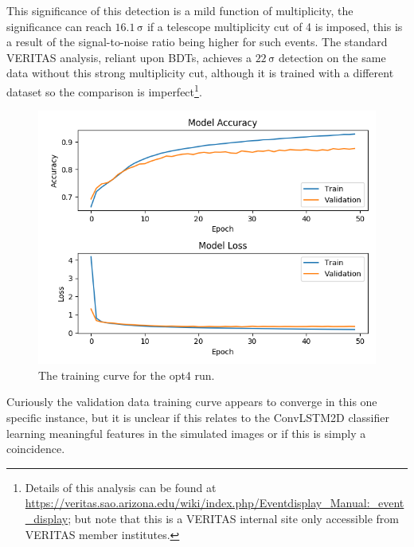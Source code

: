 \begin{table}[h]
    \centering
    \caption{Anasum output for the opt4 run, without applying a strenuous multiplicity cut.}
    \label{table:opt4}
\end{table}

This significance of this detection is a mild function of multiplicity, the significance can reach $\mathrm{16.1\,\sigma}$ if a telescope multiplicity cut of 4 is imposed, this is a result of the signal-to-noise ratio being higher for such events. The standard VERITAS analysis, reliant upon BDTs, achieves a $\mathrm{22\,\sigma}$ detection on the same data without this strong multiplicity cut, although it is trained with a different dataset so the comparison is imperfect\footnote{Details of this analysis can be found at \url{https://veritas.sao.arizona.edu/wiki/index.php/Eventdisplay_Manual:_event_display}; but note that this is a VERITAS internal site only accessible from VERITAS member institutes.}.
\begin{figure}[h] 
        \centering \includegraphics[width=\columnwidth]{figures/crabrun2opt4trainlog.png}

        \caption{
                \label{fig:opt4_trainlog} The training curve for the opt4 run.
        }
\end{figure}
Curiously the validation data training curve appears to converge in this one specific instance, but it is unclear if this relates to the ConvLSTM2D classifier learning meaningful features in the simulated images or if this is simply a coincidence. 

